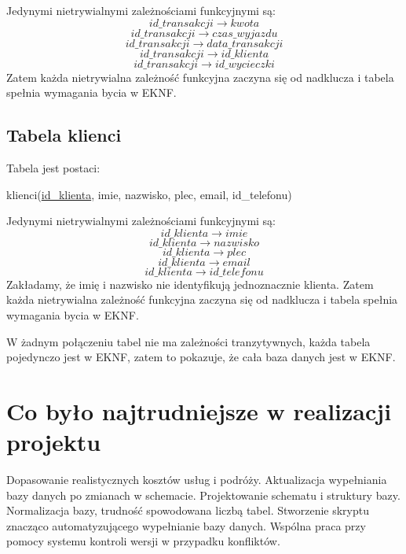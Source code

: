 \documentclass[a4paper,12pt]{mwart}
\begin{document}
\noindent Jedynymi nietrywialnymi zależnościami funkcyjnymi są:
$$   id\_transakcji\rightarrow kwota $$
$$   id\_transakcji\rightarrow czas\_wyjazdu$$
$$   id\_transakcji\rightarrow data\_transakcji $$
$$   id\_transakcji\rightarrow id\_klienta $$
$$   id\_transakcji\rightarrow id\_wycieczki $$
Zatem każda nietrywialna zależność funkcyjna zaczyna się od nadklucza i tabela  spełnia wymagania bycia w EKNF.

\subsection{Tabela klienci}
Tabela jest postaci:

klienci(\underline{id\_klienta}, imie, nazwisko, plec, email, id\_telefonu)

\noindent Jedynymi nietrywialnymi zależnościami funkcyjnymi są:
$$   id\_klienta\rightarrow imie $$
$$   id\_klienta\rightarrow nazwisko$$
$$   id\_klienta\rightarrow plec$$
$$   id\_klienta\rightarrow email $$
$$   id\_klienta\rightarrow id\_telefonu $$
Zakładamy, że imię i nazwisko nie identyfikują jednoznacznie klienta.
Zatem każda nietrywialna zależność funkcyjna zaczyna się od nadklucza i tabela  spełnia wymagania bycia w EKNF.



W żadnym połączeniu tabel nie ma zależności tranzytywnych, każda tabela pojedynczo jest w EKNF, zatem to pokazuje, że cała baza danych jest w EKNF.

\section{Co było najtrudniejsze w realizacji projektu}

\begin{outline}
    \1 Dopasowanie realistycznych kosztów usług i podróży.
    \1 Aktualizacja wypełniania bazy danych po zmianach w schemacie.
    \1 Projektowanie schematu i struktury bazy.
    \1 Normalizacja bazy, trudność spowodowana liczbą tabel.
    \1 Stworzenie skryptu znacząco automatyzującego wypełnianie bazy danych.
    \1 Wspólna praca przy pomocy systemu kontroli wersji w przypadku konfliktów.
\end{outline}
\end{document}
